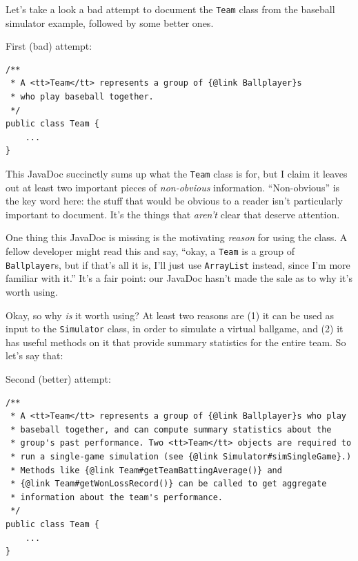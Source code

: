 Let's take a look a bad attempt to document the \texttt{Team} class from the
baseball simulator example, followed by some better ones.

\pagebreak
First (bad) attempt:
\vspace{-.15in}
\begin{Verbatim}[fontsize=\footnotesize,samepage=true,frame=single]
/**
 * A <tt>Team</tt> represents a group of {@link Ballplayer}s
 * who play baseball together.
 */
public class Team {
    ...
}
\end{Verbatim}
\vspace{-.1in}

This JavaDoc succinctly sums up what the \texttt{Team} class is for, but I
claim it leaves out at least two important pieces of \textit{non-obvious}
information. ``Non-obvious'' is the key word here: the stuff that would be
obvious to a reader isn't particularly important to document. It's the things
that \textit{aren't} clear that deserve attention.

One thing this JavaDoc is missing is the motivating \textit{reason} for using
the class. A fellow developer might read this and say, ``okay, a \texttt{Team}
is a group of \texttt{Ballplayer}s, but if that's all it is, I'll just use
\texttt{ArrayList} instead, since I'm more familiar with it.'' It's a fair
point: our JavaDoc hasn't made the sale as to why it's worth using.

Okay, so why \textit{is} it worth using? At least two reasons are (1) it can
be used as input to the \texttt{Simulator} class, in order to simulate a
virtual ballgame, and (2) it has useful methods on it that provide summary
statistics for the entire team. So let's say that:

\smallskip
Second (better) attempt:
\vspace{-.15in}
\begin{Verbatim}[fontsize=\scriptsize,samepage=true,frame=single]
/**
 * A <tt>Team</tt> represents a group of {@link Ballplayer}s who play
 * baseball together, and can compute summary statistics about the
 * group's past performance. Two <tt>Team</tt> objects are required to
 * run a single-game simulation (see {@link Simulator#simSingleGame}.)
 * Methods like {@link Team#getTeamBattingAverage()} and
 * {@link Team#getWonLossRecord()} can be called to get aggregate
 * information about the team's performance.
 */
public class Team {
    ...
}
\end{Verbatim}

